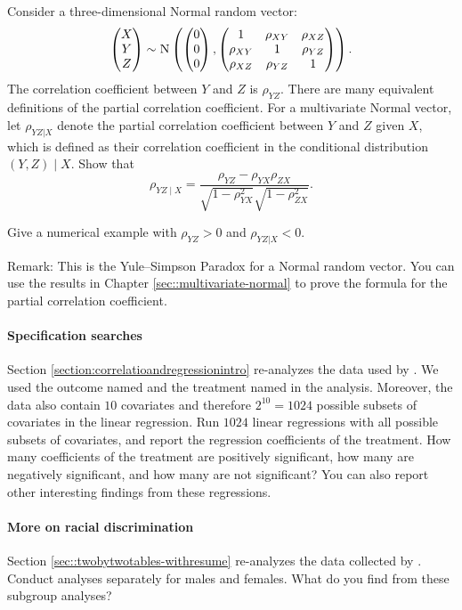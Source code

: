 Consider a three-dimensional Normal random vector:
$$
\begin{pmatrix}
X\\
Y\\
Z
\end{pmatrix}
\sim 
\textsc{N}
\left(
\begin{pmatrix}
0\\
0\\
0
\end{pmatrix},
\begin{pmatrix}
1 & \rho_{XY} &\rho_{XZ} \\
  \rho_{XY}  & 1 & \rho_{YZ} \\
  \rho_{XZ} &  \rho_{YZ} & 1
\end{pmatrix}
\right) . 
$$
The correlation coefficient between $Y$ and $Z$ is $\rho_{YZ}$. 
There are many equivalent definitions of the partial correlation coefficient. 
For a multivariate Normal vector, let $\rho_{YZ|X}$ denote the partial correlation coefficient between $Y$ and $Z$ given $X$, which is defined as their correlation coefficient in the conditional distribution $(Y, Z)\mid X$. Show that
$$
\rho_{YZ\mid X} = \frac{   \rho_{YZ} - \rho_{YX} \rho_{ZX}  }{  \sqrt{  1-\rho_{YX}^2 }  \sqrt{1- \rho_{ZX}^2  }  }  . 
$$

Give a numerical example with $\rho_{YZ} > 0$ and $\rho_{YZ|X} < 0$. 

Remark: This is the Yule--Simpson Paradox for a Normal random vector. 
You can use the results in Chapter \ref{sec::multivariate-normal} to prove the formula for the partial correlation coefficient. 



\paragraph{Specification searches}\label{hw::lalonde-obs-reg}

Section \ref{section:correlatioandregressionintro} re-analyzes the data used by \citet{hainmueller2012entropy}. We used the outcome named  and the treatment named  in the analysis. Moreover, the data also contain $10$ covariates and therefore $2^{10} = 1024$ possible subsets of covariates in the linear regression. Run $1024$ linear regressions with all possible subsets of covariates, and report the regression coefficients of the treatment. How many coefficients of the treatment are positively significant, how many are negatively significant, and how many are not significant? You can also report other interesting findings from these regressions.


\paragraph{More on racial discrimination}

Section \ref{sec::twobytwotables-withresume} re-analyzes the data collected by \citet{bertrand2004emily}. Conduct analyses separately for males and females. What do you find from these subgroup analyses?


